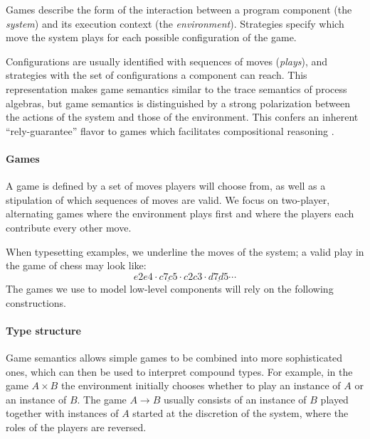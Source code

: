 \documentclass[sigplan,screen]{acmart}
\begin{document}
Games describe the form of the interaction
between a program component %
(the \emph{system})
and its execution context
(the \emph{environment}).
Strategies
specify which move the system plays
for each possible configuration of the game.

Configurations are usually identified with sequences of moves
(\emph{plays}),
and strategies with the set of configurations
a component can reach.
This representation makes
game semantics similar to
the trace semantics of process algebras,
but game semantics is distinguished
by a strong polarization between
the actions of the system and those of the environment.
This confers an inherent ``rely-guarantee'' flavor
to games which facilitates compositional reasoning
\cite{cspgs}.


\paragraph{Games} \label{sec:mainideas:gs:games} %

A game is defined by a set of moves
players will choose from,
as well as a stipulation of which
sequences of moves are valid.
We focus on two-player, alternating games
where the environment plays first and
where the players
each contribute every other move.

When typesetting examples,
we underline the moves of the system;
a valid play in the game of chess may look like:
\[ e2e4 \cdot \underline{c7c5} \cdot c2c3 \cdot \underline{d7d5} \cdots \]
The games we use to model low-level components
will rely on the following constructions.


\paragraph{Type structure} \label{sec:mainideas:gs:types} %

Game semantics allows
simple games to be combined into more sophisticated ones,
which can then be used
to interpret compound types.
For example,
in the game $A \times B$
the environment initially chooses whether to play
an instance of $A$ or an instance of $B$.
The game $A \rightarrow B$ usually consists of
an instance of $B$ played
together with instances of $A$
started at the discretion of the system,
where the roles of the players are reversed.
\end{document}
